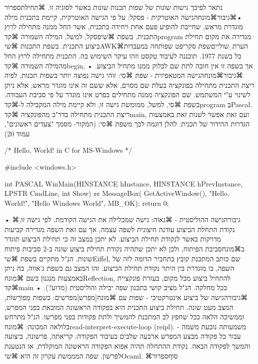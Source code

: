 נתאר לפיכך גישות שונות של שפות תכנות שונות באשר לסוגיה זו.
⌘תחילת{ספרור}
•⌘גיבור{⌘מונח{הגישה האוטרקית} - פסקל:} על פי הגישה האוטרקית, קיימת בתכנית מילה מוגדרת מראש, שחייבת להופיע פעם אחת ויחידה בתכנית, אשר החל ממנה מתחילה לרוץ התכנית. בשפת ⌘שי{פסקל}, למשל, המילה השמורה ⌘קד{program} מגדירה את מקום תחילת ביצוע התכנית. בשפת התכנות ⌘שי{AWK}⌘הערת␣שוליים{שפת סקריפט שפותחה במעבדות בל בשנת 1977. תוכננה לעיבוד טקסט וזהו עיקר השימוש בה.} התכנית מתחילה לרוץ החל מהמילה השמורה ⌘קד{begin}, אך בשפה זו אין חובה לתת שם לבלוק ממנו מתחיל הביצוע.
• ⌘גיבור{⌘מונח{הגישה המטאפיזית} - שפת ⌘סי:} זוהי גישה נפוצה יותר בשפות תכנות, לפיה ריצת התכנית מתחילה בפונקציה בעלת שם מסוים, אלא ששם זה אינו מוגדר מראש, אלא ניתן לשינוי ע"י המשתמש. שם הפונקציה ממנה מתחילים 
בפרט אינו מוגדר על פי סביבת העבודה. בשפת ⌘סי, למשל, ממומשת גישה זו, ולא קיימת מילה המקבילה
ל-⌘קד{program} בְּPascal. ריצת התכנית מתחילה בדר"כ מהפונקציה ⌘קד{main}, ועם זאת אפשר לשנות זאת באמצעות
הגדרות ההידור של תכנית. להלן דוגמה לכך משפת ⌘סי: (המקור- מסמך "צעדים ראשונים", עמוד 20)
\begin{CPPn}
  /* Hello, World! in C for MS-Windows */

  #include <windows.h>

  int PASCAL WinMain(HINSTANCE hInstance,
  HINSTANCE hPrevInstance, LPSTR CmdLine, int Show)
  {¢¢
    MessageBox(
    GetActiveWindow(),
    "Hello, World!",
    "Hello Windows World",
    MB_OK);
    return 0;
  }
\end{CPPn}
• ⌘גיבור{הגישה ההוליסטית - ⌘גאוה:} גישה שמכלילה את הגישה הקודמת. לפי גישה זו, נקודת התחלת הביצוע עודנה חיצונית לשפה עצמה, אך עם זאת השפה מגדירה קביעות מדויקות באשר לנקודת תחילת הביצוע. לא יתכן במצב זה כי תחילת הביצוע תוגדר ב⌘מונח{סביבת הפיתוח}, ולכן לא יתכן שתהיה נקודת תחילת ביצוע שונה ב-2 סביבות פיתוח שונות. הנ"ל מתקיים בשפת ⌘שי{Eiffel}, שם כותב המתכנת קובץ בתחביר הדומה לזה של השפה, בו מוגדרת בין היתר נקודת תחילת הביצוע. זהו המצב גם בשפת ג'אווה, בה ניתן באמצעות מנגנון בשם ⌘מונח{Reflection}, להתחיל ביצוע מכל מקום, בעזרת פונקציית ⌘קד{main} בכל מחלקה. הנ"ל מציב קושי בתכנון שפה יבילה והוליסטית (מדוע?).
• ⌘גיבור{הגישה של ביצוע אינטרקטיבי - שפות עם ⌘מונח[מפרש]{מפרשים}:} בשפות מֵפוׂרַשוׂת, המצב מעט שונה. תחילת ביצוע התכנית היא בפקודה הראשונה המובאת בפני המפרש, וממשיכה הלאה ככל שחפץ לב המתכנת להמשיך ולתת פקודות בפני מפרשו. הנ"ל מתרחש בלולאה המכונה: ⌘מונח{read-interpret-execute-loop (reipl)}. משמעותה נובעת משמה - עבור כל פקודה מבצע המפרש ארבעה שלבים בעיבוד הפקודה: קריאתה, פרשונה, ביצועה והמשך לפקודה הבאה. נקודת ההתחלה תהיה אפוא הפקודה הראשונה המוקלדת, או הנטענת לפרשון. שפה המממשת עקרון זה היא  ⌘שי{Ocaml}.
⌘סוף{ספרור}

